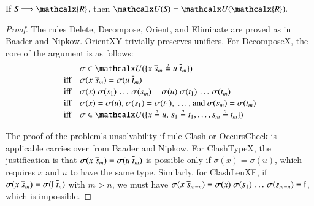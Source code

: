   \begin{lemma}\label{lemma:ehoh:unif-preserve}
    If $\mathit{S} \Unifarrow \mathcalx{R}$, then $\Unifier(\mathit{S}) = \Unifier(\mathcalx{R}).$
  \end{lemma}
  \begin{proof}
    The rules \textsf{Delete}, \textsf{Decompose}, \textsf{Orient}, and
    \textsf{Eliminate} are proved as in Baader and Nipkow.
    \textsf{OrientXY} trivially preserves unifiers.
    For \textsf{DecomposeX}, the core of the argument is as follows:
    \begin{align*}
    & \sigma \in \Unifier(\{ x \; \tuple{s}{{m}} \unif u \; \tuple{t}{{m}} \}) \\[-.5\jot]
      \text{iff}\quad
    & \sigma(x \; \tuple{s}{{m}}) = \sigma(u \; \tuple{t}{{m}}) \\[-.5\jot]
      \text{iff}\quad
    & \sigma(x) \; \sigma(s_1) \, \ldots \, \sigma(s_m)
        = \sigma(u) \; \sigma(t_1) \, \ldots \, \sigma(t_m) \\[-.5\jot]
      \text{iff}\quad
    & \sigma(x) = \sigma(u){,}~ \sigma(s_1) = \sigma(t_1){,}\; \ldots{,}~ \text{and}~ \sigma(s_m) = \sigma(t_m) \\[-.5\jot]
      \text{iff}\quad
    & \sigma \in \Unifier(\{ x \unif u{,}\; s_1 \unif t_1, \ldots, s_{m} \unif t_{m}\})
    \end{align*}

    The proof of the problem's unsolvability if rule \textsf{Clash} or
    \textsf{OccursCheck} is applicable carries over from Baader and Nipkow.
    For \textsf{ClashTypeX}, the justification is that $\sigma(x \;
    \overline{s}_{m}) = \sigma(u \; \overline{t}_{m})$ is possible only if
    $\sigma(x) = \sigma(u)$, which requires $x$ and $u$ to have the same
    type. Similarly, for \textsf{ClashLenXF}, if
    $\sigma(x \; \overline{s}_{m}) = \sigma(\mathsf{f} \; \overline{t}_{n})$ with
    $m > n$, we must have $\sigma(x \; \overline{s}_{{m-n}}) =
    \sigma(x) \; \sigma(s_1) \, \dots \, \sigma(s_{m-n}) = \mathsf{f}$,
    which is impossible.
  \end{proof}

